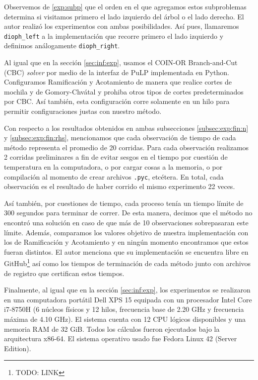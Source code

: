 Observemos de  \eqref{exp:subp} que el orden en el que agregamos estos
subproblemas determina si visitamos primero el lado izquierdo del árbol o el lado derecho. El autor
realizó los experimentos con ambas posibilidades. Así pues, llamaremos \texttt{dioph\_left} a la
implementación que recorre primero el lado izquierdo y definimos análogamente \texttt{dioph\_right}.

Al igual que en la sección \ref{sec:inf:exp}, usamos el COIN-OR Branch-and-Cut (CBC) \textit{solver}
por medio de la interfaz de PuLP implementada en Python. Configuramos Ramificación y Acotamiento de
manera que realice cortes de mochila y de Gomory-Chvátal y prohiba otros tipos de cortes
predeterminados por CBC. Así también, esta configuración corre solamente en un hilo para permitir
configuraciones justas con nuestro método.

Con respecto a los resultados obtenidos en ambas subsecciones \ref{subsec:exp:fin:n} y
\ref{subsec:exp:fin:rhs}, mencionamos que cada observación de tiempo de cada método representa el
promedio de 20 corridas. Para cada observación realizamos 2 corridas preliminares a fin
de evitar sesgos en el tiempo por cuestión de temperatura en la computadora, o por cargar cosas a la
memoria, o por compilación al momento de crear archivos \texttt{.pyc}, etcétera. En total, cada
observación es el resultado de haber corrido el mismo experimento 22 veces.

Así también, por cuestiones de tiempo, cada proceso tenía un tiempo límite de 300 segundos para
terminar de correr. De esta manera, decimos que el método no encontró una solución en caso de que
más de 10 observaciones sobrepasaran este límite. Además, comparamos los valores objetivo de nuestra
implementación con los de Ramificación y Acotamiento y en ningún momento
encontramos que estos fueran distintos. El autor menciona que su implementación se
encuentra libre en GitHub\footnote{TODO: LINK} así como los tiempos de terminación de cada método
junto con archivos de registro que certifican estos tiempos.

Finalmente, al igual que en la sección \ref{sec:inf:exp}, los experimentos se realizaron en una
computadora portátil Dell XPS 15 equipada con un procesador Intel Core i7-8750H (6 núcleos físicos
y 12 hilos, frecuencia base de 2.20 GHz y frecuencia máxima de 4.10 GHz). El sistema cuenta con 12
CPU lógicos disponibles y una memoria RAM de 32 GiB. Todos los cálculos fueron ejecutados bajo la
arquitectura x86-64. El sistema operativo usado fue Fedora Linux 42 (Server Edition).

